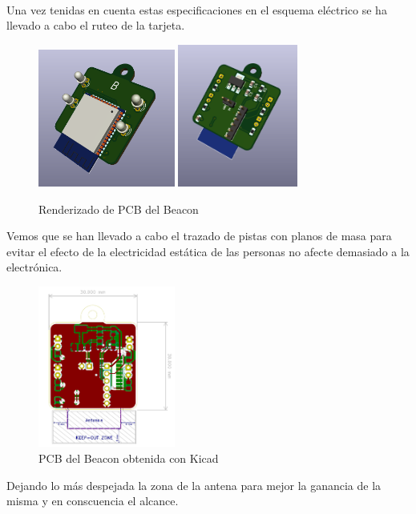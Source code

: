 \documentclass[a4paper ,12pt, onecolumn]{article}
\begin{document}
        \paragraph{}
        Una vez tenidas en cuenta estas especificaciones en el esquema eléctrico se ha llevado a cabo el ruteo de la tarjeta.
        \begin{center}
            \begin{figure}[h]
                \centering
                \includegraphics[width=0.4\textwidth]{../emiter_1.PNG}
                \includegraphics[width=0.35\textwidth]{../emiter_2.PNG}
                \caption{Renderizado de PCB del Beacon}
                \label{fig:mesh1}
            \end{figure}    
        \end{center}
        Vemos que se han llevado a cabo el trazado de pistas con planos de masa para evitar el efecto de la 
        electricidad estática de las personas no afecte demasiado a la electrónica.
        \begin{center}
            \begin{figure}[h]
                \centering
                \includegraphics[width=0.40\textwidth]{../emiter_PCB.PNG}
                \caption{PCB del Beacon obtenida con Kicad}
                \label{fig:mesh1}
            \end{figure}    
        \end{center}
        Dejando lo más despejada la zona de la antena para mejor la ganancia de la misma y en conscuencia el alcance.
\end{document}
